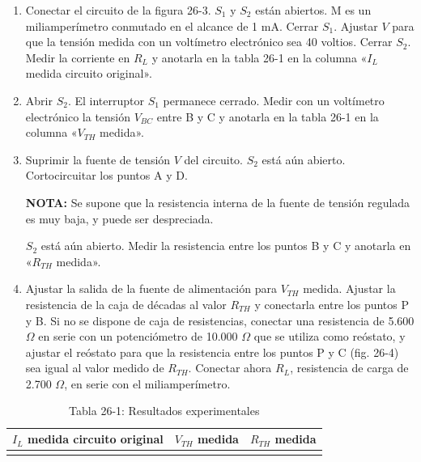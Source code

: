 \documentclass{article}
\begin{document}
\begin{enumerate}
    \item Conectar el circuito de la figura 26-3. $S_1$ y $S_2$ están abiertos. M es un miliamperímetro conmutado en el alcance de 1 mA. Cerrar $S_1$. Ajustar $V$ para que la tensión medida con un voltímetro electrónico sea 40 voltios. Cerrar $S_2$. Medir la corriente en $R_L$ y anotarla en la tabla 26-1 en la columna «$I_L$ medida circuito original».
    
    \item Abrir $S_2$. El interruptor $S_1$ permanece cerrado. Medir con un voltímetro electrónico la tensión $V_{BC}$ entre B y C y anotarla en la tabla 26-1 en la columna «$V_{TH}$ medida».
    
    \item Suprimir la fuente de tensión $V$ del circuito. $S_2$ está aún abierto. Cortocircuitar los puntos A y D.
    
    \textbf{NOTA:} Se supone que la resistencia interna de la fuente de tensión regulada es muy baja, y puede ser despreciada.
    
    $S_2$ está aún abierto. Medir la resistencia entre los puntos B y C y anotarla en «$R_{TH}$ medida».
    
    \item Ajustar la salida de la fuente de alimentación para $V_{TH}$ medida. Ajustar la resistencia de la caja de décadas al valor $R_{TH}$ y conectarla entre los puntos P y B. Si no se dispone de caja de resistencias, conectar una resistencia de 5.600 $\Omega$ en serie con un potenciómetro de 10.000 $\Omega$ que se utiliza como reóstato, y ajustar el reóstato para que la resistencia entre los puntos P y C (fig. 26-4) sea igual al valor medido de $R_{TH}$. Conectar ahora $R_L$, resistencia de carga de 2.700 $\Omega$, en serie con el miliamperímetro.
\end{enumerate}

\begin{table}[h]
\centering
\caption{Tabla 26-1: Resultados experimentales}
\begin{tabular}{|c|c|c|}
\hline
$I_L$ medida circuito original & $V_{TH}$ medida & $R_{TH}$ medida \\
\hline
 & & \\
\hline
\end{tabular}
\end{table}
\end{document}
